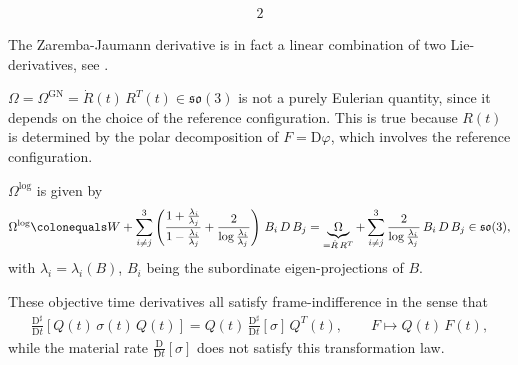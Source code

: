 \documentclass[10pt]{article}
\numberwithin{theoremCounter}{section}
\theoremstyle{plain}
\theoremstyle{definition}
\newcommand{\DD}{\mathrm{D}}
\DeclareMathOperator{\GN}{GN}
\numberwithin{equation}{section}
\begin{document}
\begin{appendix}
\begin{alignat}{2}
	\end{alignat}
\addtocounter{footnote}{-2}\footnotetext
{
The Zaremba-Jaumann derivative is in fact a linear combination of two Lie-derivatives, see \cite[p.100, box 6.1]{Marsden83}.
}
\addtocounter{footnote}{+1}\footnotetext
{
$\Omega = \Omega^{\GN} = \dot{R}(t) \, R^T(t) \in \mathfrak{so}(3)$ is not a purely Eulerian quantity, since it depends on the choice of the reference configuration. This is true because $R(t)$ is determined by the polar decomposition of $F = \DD \varphi$, which involves the reference configuration.
}
\addtocounter{footnote}{+1}\footnotetext
{ \label{footnoteomega}
$\Omega^{\log}$ is given by
	\begin{align*}
	\Omega^{\log} \colonequals W + \sum_{i \neq j}^3 \left(\frac{1+\frac{\lambda_i}{\lambda_j}}{1 - \frac{\lambda_i}{\lambda_j}} + \frac{2}{\log\frac{\lambda_i}{\lambda_j}}\right) \, B_i \, D \, B_j = \underbrace{\Omega}_{= \dot{R} \, R^T} + \sum_{i \neq j}^3 \frac{2}{\log \frac{\lambda_i}{\lambda_j}} \, B_i \, D \, B_j \in \mathfrak{so}(3),
	\end{align*}
with $\lambda_i = \lambda_i(B)$, $B_i$ being the subordinate eigen-projections of $B$.
}

\noindent These objective time derivatives all satisfy frame-indifference in the sense that
	\begin{align}
	\frac{\DD^{\sharp}}{\DD t}[Q(t) \, \sigma(t) \, Q(t)] = Q(t) \, \frac{\DD^{\sharp}}{\DD t} [\sigma] \, Q^T(t), \qquad F \mapsto Q(t) \, F(t),
	\end{align}
while the material rate $\frac{\DD}{\DD t}[\sigma]$ does not satisfy this transformation law.
%

\end{appendix}
\end{document}
